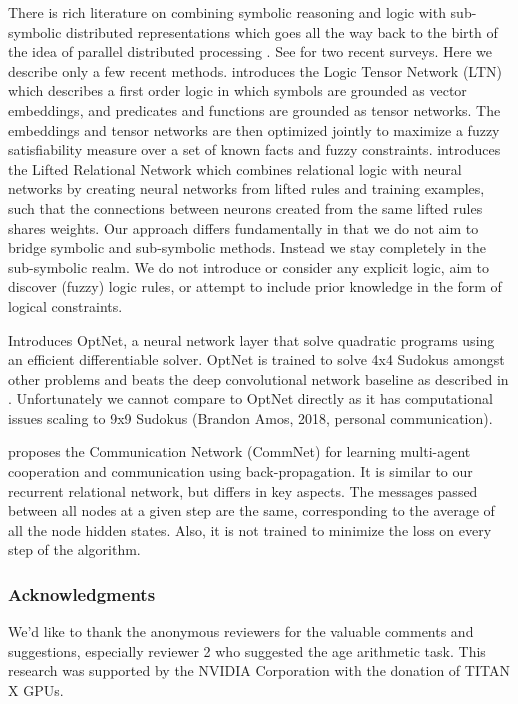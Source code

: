 \documentclass{article}
\begin{document}
There is rich literature on combining symbolic reasoning and logic with sub-symbolic distributed representations which goes all the way back to the birth of the idea of parallel distributed processing \citet{mcculloch1943logical}.
See \citep{raedt2016statistical, besold2017neural} for two recent surveys.
Here we describe only a few recent methods.
\citet{serafini2016learning} introduces the Logic Tensor Network (LTN) which describes a first order logic in which symbols are grounded as vector embeddings, and predicates and functions are grounded as tensor networks.
The embeddings and tensor networks are then optimized jointly to maximize a fuzzy satisfiability measure over a set of known facts and fuzzy constraints.
\citet{vsourek2015lifted} introduces the Lifted Relational Network which combines relational logic with neural networks by creating neural networks from lifted rules and training examples, such that the connections between neurons created from the same lifted rules shares weights.
Our approach differs fundamentally in that we do not aim to bridge symbolic and sub-symbolic methods.
Instead we stay completely in the sub-symbolic realm.
We do not introduce or consider any explicit logic, aim to discover (fuzzy) logic rules, or attempt to include prior knowledge in the form of logical constraints.

\citet{amos2017optnet} Introduces OptNet, a neural network layer that solve quadratic programs using an efficient differentiable solver.
OptNet is trained to solve 4x4 Sudokus amongst other problems and beats the deep convolutional network baseline as described in \citet{park2016can}.
Unfortunately we cannot compare to OptNet directly as it has computational issues scaling to 9x9 Sudokus (Brandon Amos, 2018, personal communication).

\citet{sukhbaatar2016learning} proposes the Communication Network (CommNet) for learning multi-agent cooperation and communication using back-propagation. It is similar to our recurrent relational network, but differs in key aspects. The messages passed between all nodes at a given step are the same, corresponding to the average of all the node hidden states. Also, it is not trained to minimize the loss on every step of the algorithm.

\subsubsection*{Acknowledgments}
We'd like to thank the anonymous reviewers for the valuable comments and suggestions, especially reviewer 2 who suggested the age arithmetic task.
This research was supported by the NVIDIA Corporation with the donation of TITAN X GPUs.





\end{document}
